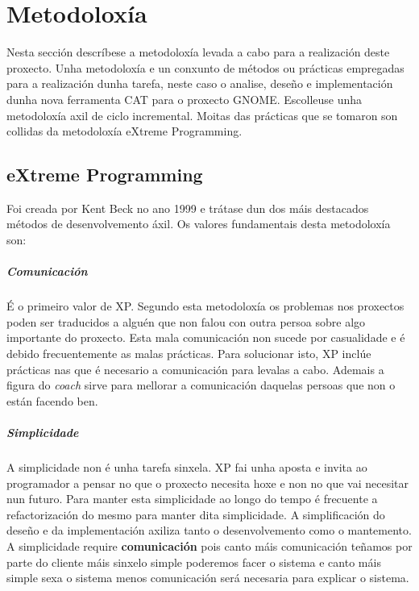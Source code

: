 \chapter{Metodoloxía}

Nesta sección descríbese a metodoloxía levada a cabo para a realización deste proxecto. Unha metodoloxía e un conxunto de métodos ou prácticas empregadas para a realización dunha tarefa, neste caso o analise, deseño e implementación dunha nova ferramenta CAT para o proxecto GNOME. Escolleuse unha metodoloxía axil de ciclo incremental. Moitas das prácticas que se tomaron son collidas da metodoloxía eXtreme Programming.

\section{eXtreme Programming}

Foi creada por Kent Beck no ano 1999 e trátase dun dos máis destacados métodos de desenvolvemento áxil. Os valores fundamentais desta metodoloxía son:

\paragraph{Comunicación} É o primeiro valor de XP. Segundo esta metodoloxía os problemas nos proxectos poden ser traducidos a alguén que non falou con outra persoa sobre algo importante do proxecto. Esta mala comunicación non sucede por casualidade e é debido frecuentemente as malas prácticas. Para solucionar isto, XP inclúe prácticas nas que é necesario a comunicación para levalas a cabo. Ademais a figura do \emph{coach} sirve para mellorar a comunicación daquelas persoas que non o están facendo ben.

\paragraph{Simplicidade} A simplicidade non é unha tarefa sinxela. XP fai unha aposta e invita ao programador a pensar no que o proxecto necesita hoxe e non no que vai necesitar nun futuro. Para manter esta simplicidade ao longo do tempo é frecuente a refactorización do mesmo para manter dita simplicidade. A simplificación do deseño e da implementación axiliza tanto o desenvolvemento como o mantemento. A simplicidade require \textbf{comunicación} pois canto máis comunicación teñamos por parte do cliente máis sinxelo simple poderemos facer o sistema e canto máis simple sexa o sistema menos comunicación será necesaria para explicar o sistema.

